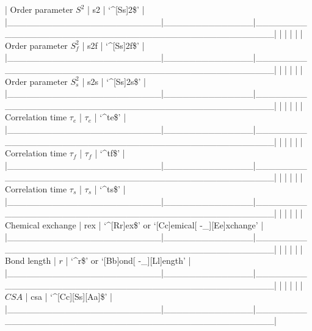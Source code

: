 | Order parameter $S^2$     | s2           | `\^{}[Ss]2\$'                                        |
|\_\_\_\_\_\_\_\_\_\_\_\_\_\_\_\_\_\_\_\_\_\_\_\_|\_\_\_\_\_\_\_\_\_\_\_\_\_\_|\_\_\_\_\_\_\_\_\_\_\_\_\_\_\_\_\_\_\_\_\_\_\_\_\_\_\_\_\_\_\_\_\_\_\_\_\_\_\_\_\_\_\_\_\_\_\_\_\_\_|
|                        |              |                                                  |
| Order parameter $S^2_f$    | s2f          | `\^{}[Ss]2f\$'                                       |
|\_\_\_\_\_\_\_\_\_\_\_\_\_\_\_\_\_\_\_\_\_\_\_\_|\_\_\_\_\_\_\_\_\_\_\_\_\_\_|\_\_\_\_\_\_\_\_\_\_\_\_\_\_\_\_\_\_\_\_\_\_\_\_\_\_\_\_\_\_\_\_\_\_\_\_\_\_\_\_\_\_\_\_\_\_\_\_\_\_|
|                        |              |                                                  |
| Order parameter $S^2_s$    | s2s          | `\^{}[Ss]2s\$'                                       |
|\_\_\_\_\_\_\_\_\_\_\_\_\_\_\_\_\_\_\_\_\_\_\_\_|\_\_\_\_\_\_\_\_\_\_\_\_\_\_|\_\_\_\_\_\_\_\_\_\_\_\_\_\_\_\_\_\_\_\_\_\_\_\_\_\_\_\_\_\_\_\_\_\_\_\_\_\_\_\_\_\_\_\_\_\_\_\_\_\_|
|                        |              |                                                  |
| Correlation time $\tau_e$    | $\tau_e$           | `\^{}te\$'                                           |
|\_\_\_\_\_\_\_\_\_\_\_\_\_\_\_\_\_\_\_\_\_\_\_\_|\_\_\_\_\_\_\_\_\_\_\_\_\_\_|\_\_\_\_\_\_\_\_\_\_\_\_\_\_\_\_\_\_\_\_\_\_\_\_\_\_\_\_\_\_\_\_\_\_\_\_\_\_\_\_\_\_\_\_\_\_\_\_\_\_|
|                        |              |                                                  |
| Correlation time $\tau_f$    | $\tau_f$           | `\^{}tf\$'                                           |
|\_\_\_\_\_\_\_\_\_\_\_\_\_\_\_\_\_\_\_\_\_\_\_\_|\_\_\_\_\_\_\_\_\_\_\_\_\_\_|\_\_\_\_\_\_\_\_\_\_\_\_\_\_\_\_\_\_\_\_\_\_\_\_\_\_\_\_\_\_\_\_\_\_\_\_\_\_\_\_\_\_\_\_\_\_\_\_\_\_|
|                        |              |                                                  |
| Correlation time $\tau_s$    | $\tau_s$           | `\^{}ts\$'                                           |
|\_\_\_\_\_\_\_\_\_\_\_\_\_\_\_\_\_\_\_\_\_\_\_\_|\_\_\_\_\_\_\_\_\_\_\_\_\_\_|\_\_\_\_\_\_\_\_\_\_\_\_\_\_\_\_\_\_\_\_\_\_\_\_\_\_\_\_\_\_\_\_\_\_\_\_\_\_\_\_\_\_\_\_\_\_\_\_\_\_|
|                        |              |                                                  |
| Chemical exchange      | rex          | `\^{}[Rr]ex\$' or `[Cc]emical[ -\_][Ee]xchange'       |
|\_\_\_\_\_\_\_\_\_\_\_\_\_\_\_\_\_\_\_\_\_\_\_\_|\_\_\_\_\_\_\_\_\_\_\_\_\_\_|\_\_\_\_\_\_\_\_\_\_\_\_\_\_\_\_\_\_\_\_\_\_\_\_\_\_\_\_\_\_\_\_\_\_\_\_\_\_\_\_\_\_\_\_\_\_\_\_\_\_|
|                        |              |                                                  |
| Bond length            | $r$            | `\^{}r\$' or `[Bb]ond[ -\_][Ll]ength'                 |
|\_\_\_\_\_\_\_\_\_\_\_\_\_\_\_\_\_\_\_\_\_\_\_\_|\_\_\_\_\_\_\_\_\_\_\_\_\_\_|\_\_\_\_\_\_\_\_\_\_\_\_\_\_\_\_\_\_\_\_\_\_\_\_\_\_\_\_\_\_\_\_\_\_\_\_\_\_\_\_\_\_\_\_\_\_\_\_\_\_|
|                        |              |                                                  |
| $CSA$                    | csa          | `\^{}[Cc][Ss][Aa]\$'                                 |
|\_\_\_\_\_\_\_\_\_\_\_\_\_\_\_\_\_\_\_\_\_\_\_\_|\_\_\_\_\_\_\_\_\_\_\_\_\_\_|\_\_\_\_\_\_\_\_\_\_\_\_\_\_\_\_\_\_\_\_\_\_\_\_\_\_\_\_\_\_\_\_\_\_\_\_\_\_\_\_\_\_\_\_\_\_\_\_\_\_|




